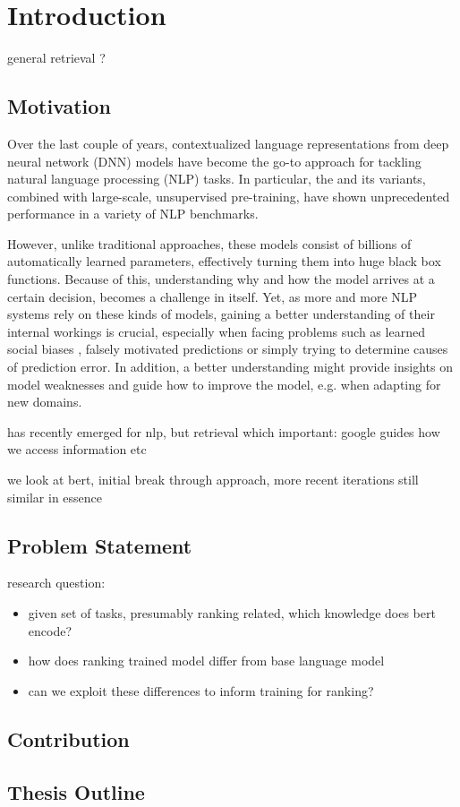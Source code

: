 \chapter{Introduction}
general retrieval ?
\section{Motivation}
Over the last couple of years, contextualized language representations from deep neural network (DNN) models have become the go-to approach for tackling natural language processing (NLP) tasks. In particular, the  \cite{vaswani2017attention} and its variants, combined with large-scale, unsupervised pre-training, have shown unprecedented performance in a variety of NLP benchmarks.

However, unlike traditional approaches, these models consist of billions of automatically learned parameters, effectively turning them into huge black box functions. Because of this, understanding why and how the model arrives at a certain decision, becomes a challenge in itself. Yet, as more and more NLP systems rely on these kinds of models, gaining a better understanding of their internal workings is crucial, especially when facing problems such as learned social biases \cite{Nadeem2021StereoSetMS,Bender2021OnTD, kurita2019measuring}, falsely motivated predictions \cite{10.1145/2939672.2939778, DBLP:journals/corr/abs-1802-00614} or simply trying to determine causes of prediction error. In addition, a better understanding might provide insights on model weaknesses and guide how to improve the model, e.g. when adapting for new domains.

has recently emerged for nlp, but retrieval which important: google guides how we access information etc

we look at bert, initial break through approach, more recent iterations still similar in essence

\section{Problem Statement}
research question:
\begin{itemize}
    \item given set of tasks, presumably ranking related, which knowledge does bert encode?
    \item how does ranking trained model differ from base language model
    \item can we exploit these differences to inform training for ranking?
\end{itemize}
\section{Contribution}

\section{Thesis Outline}

